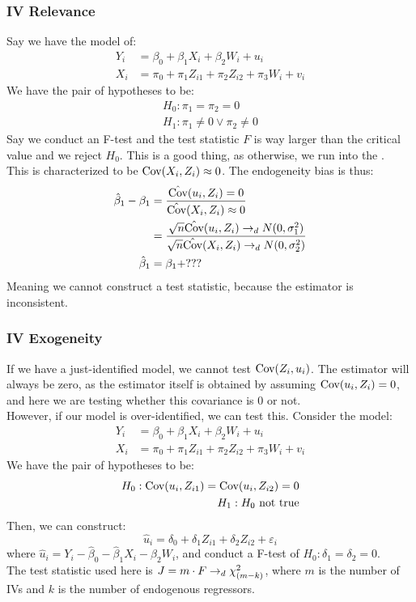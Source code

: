 \subsubsection{IV Relevance}
Say we have the model of:
\begin{align*}
    Y_i &= \beta_0 + \beta_1 X_i + \beta_2 W_i + u_i \\
    X_i &= \pi_0 + \pi_1 Z_{i1} + \pi_2 Z_{i2} + \pi_3 W_i + v_i
\end{align*}
We have the pair of hypotheses to be:
\begin{align*}
    H_0: \pi_1 = \pi_2 = 0 \\
    H_1: \pi_1 \ne 0 \lor \pi_2 \ne 0
\end{align*}
Say we conduct an F-test and the test statistic $F$ is way larger than the critical value and we reject $H_0$. This is a good thing, as otherwise, we run into the . \\
This is characterized to be $\text{Cov}(X_i, Z_i) \approx 0$. The endogeneity bias is thus:
\begin{align*}
    \hat{\beta}_1 - \beta_1 &= \frac{\hat{\text{Cov}}(u_i, Z_i) = 0}{\hat{\text{Cov}}(X_i, Z_i) \approx 0} \\
    &= \frac{\sqrt{n}\hat{\text{Cov}}(u_i, Z_i) \to_d N(0, \sigma_1^2)}{\sqrt{n}\hat{\text{Cov}}(X_i, Z_i) \to_d N(0, \sigma_2^2)} \\
    \hat{\beta}_1 &= \beta_1 + ???
\end{align*}
Meaning we cannot construct a test statistic, because the estimator is inconsistent.

\subsubsection{IV Exogeneity}
If we have a just-identified model, we cannot test $\text{Cov}(Z_i, u_i)$. The estimator will always be zero, as the estimator itself is obtained by assuming $\text{Cov}(u_i, Z_i) = 0$, and here we are testing whether this covariance is $0$ or not. \\
However, if our model is over-identified, we can test this. Consider the model:
\begin{align*}
    Y_i &= \beta_0 + \beta_1 X_i + \beta_2 W_i + u_i \\
    X_i &= \pi_0 + \pi_1 Z_{i1} + \pi_2 Z_{i2} + \pi_3 W_i + v_i
\end{align*}
We have the pair of hypotheses to be:
\begin{align*}
    H_0: \text{Cov}(u_i, Z_{i1}) = \text{Cov}(u_i, Z_{i2}) = 0 \\
    H_1: H_0 \text{ not true}
\end{align*}
Then, we can construct:
$$\hat{u}_i = \delta_0 + \delta_1 Z_{i1} + \delta_2 Z_{i2} + \varepsilon_i$$
where $\hat{u}_i = Y_i - \hat{\beta}_0 - \hat{\beta}_1 X_i - \hat{\beta}_2 W_i$, and conduct a F-test of $H_0: \delta_1 = \delta_2 = 0$. \\
The test statistic used here is $J = m \cdot F \to_d \chi^2_{(m - k)}$, where $m$ is the number of IVs and $k$ is the number of endogenous regressors.


\newpage